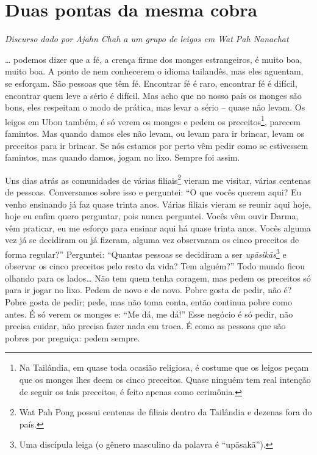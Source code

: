 
\chapter{Duas pontas da mesma cobra}

{\itshape
Discurso dado por Ajahn Chah a um grupo de leigos em Wat Pah Nanachat}

… podemos dizer que a fé, a crença firme dos monges estrangeiros, é
muito boa, muito boa. A ponto de nem conhecerem o idioma tailandês, mas
eles aguentam, se esforçam. São pessoas que têm fé. Encontrar fé é
raro, encontrar fé é difícil, encontrar quem leve a sério é difícil.
Mas acho que no nosso país os monges são bons, eles respeitam o modo de
prática, mas levar a sério – quase não levam. Os
leigos em Ubon também, é só verem os monges e pedem os
preceitos\footnote{Na Tailândia, em quase toda ocasião religiosa, é
costume que os leigos peçam que os monges lhes deem os cinco preceitos.
Quase ninguém tem real intenção de seguir os tais preceitos, é feito
apenas como cerimônia.}, parecem famintos. Mas quando damos eles não
levam, ou levam para ir brincar, levam os preceitos para ir brincar. Se
nós estamos por perto vêm pedir como se estivessem famintos, mas quando
damos, jogam no lixo. Sempre foi assim. 

Uns dias atrás as comunidades de várias filiais\footnote{Wat Pah
Pong possui centenas de filiais dentro da Tailândia e dezenas fora do
país.} vieram me visitar, várias centenas de pessoas. Conversamos sobre
isso e perguntei: “O que vocês querem aqui? Eu venho ensinando já faz
quase trinta anos. Várias filiais vieram se reunir aqui hoje, hoje eu
enfim quero perguntar, pois nunca perguntei. Vocês vêm ouvir Darma, vêm
praticar, eu me esforço para ensinar aqui há quase trinta anos. Vocês
alguma vez já se decidiram ou já fizeram, alguma vez observaram os
cinco preceitos de forma regular?” Perguntei: “Quantas pessoas se
decidiram a ser \textit{up\=asik\=as}\footnote{Uma discípula leiga (o
gênero masculino da palavra é “up\=asak\=a”).}\textit{ }e observar os
cinco preceitos pelo resto da vida? Tem alguém?” Todo mundo ficou
olhando para os lados… Não tem quem tenha coragem, mas pedem os
preceitos só para ir jogar no lixo. Pedem de novo e de novo. Pobre
gosta de pedir, não é? Pobre gosta de pedir; pede, mas não toma conta,
então continua pobre como antes. É só verem os monges e: “Me dá, me
dá!” Esse negócio é só pedir, não precisa cuidar, não precisa fazer
nada em troca. É como as pessoas que são pobres por
preguiça: pedem sempre. 


